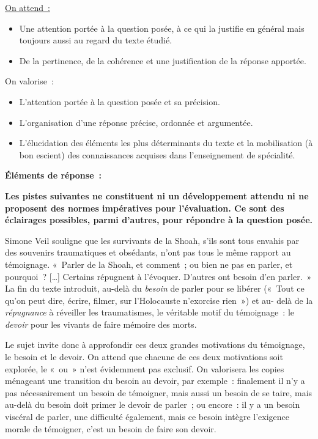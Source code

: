 {\underline{On attend~:}
\begin{itemize}
\item Une attention portée à la question posée, à ce qui la justifie en général mais toujours aussi
au regard du texte étudié.
\item De la pertinence, de la cohérence et une justification de la réponse apportée.
\end{itemize}
On valorise~:
\begin{itemize}
\item L'attention portée à la question posée et sa précision.
\item L'organisation d'une réponse précise, ordonnée et argumentée.
\item L'élucidation des éléments les plus déterminants du texte et la mobilisation (à bon escient)
des connaissances acquises dans l'enseignement de spécialité.
\end{itemize}

\bigskip

\textbf{Éléments de réponse~:}

\textbf{Les pistes suivantes ne constituent ni un développement attendu ni ne proposent des
normes impératives pour l'évaluation. Ce sont des éclairages possibles, parmi d'autres,
pour répondre à la question posée.}

Simone Veil souligne que les survivants de la Shoah, s'ils sont tous envahis par des
souvenirs traumatiques et obsédants, n'ont pas tous le même rapport au témoignage. «~Parler de
la Shoah, et comment~; ou bien ne pas en parler, et pourquoi~? […] Certains répugnent à
l'évoquer. D'autres ont besoin d'en parler.~» La fin du texte introduit, au-delà du \textit{besoin} de parler
pour se libérer («~Tout ce qu'on peut dire, écrire, filmer, sur l'Holocauste n'exorcise rien~») et au-
delà de la \textit{répugnance} à réveiller les traumatismes, le véritable motif du témoignage~: le \textit{devoir}
pour les vivants de faire mémoire des morts.

Le sujet invite donc à approfondir ces deux grandes motivations du témoignage, le besoin
et le devoir. On attend que chacune de ces deux motivations soit explorée, le «~ou~» n'est
évidemment pas exclusif. On valorisera les copies ménageant une transition du besoin au devoir,
par exemple~: finalement il n'y a pas nécessairement un besoin de témoigner, mais aussi un
besoin de se taire, mais au-delà du besoin doit primer le devoir de parler~; ou encore~: il y a un
besoin viscéral de parler, une difficulté également, mais ce besoin intègre l'exigence morale de
témoigner, c'est un besoin de faire son devoir.

}

